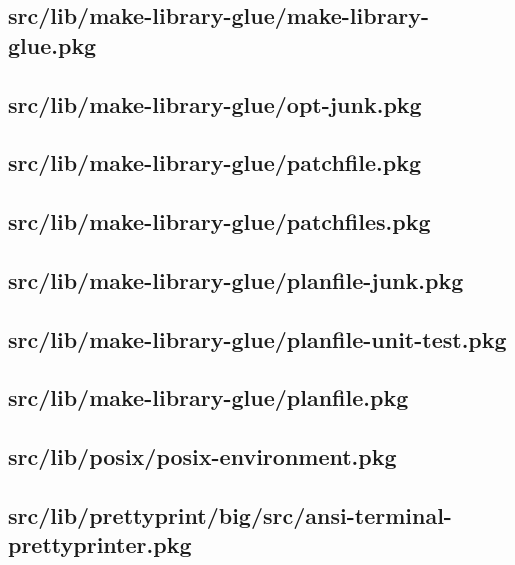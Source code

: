 \subsection{src/lib/make-library-glue/make-library-glue.pkg}


\subsection{src/lib/make-library-glue/opt-junk.pkg}


\subsection{src/lib/make-library-glue/patchfile.pkg}


\subsection{src/lib/make-library-glue/patchfiles.pkg}


\subsection{src/lib/make-library-glue/planfile-junk.pkg}


\subsection{src/lib/make-library-glue/planfile-unit-test.pkg}


\subsection{src/lib/make-library-glue/planfile.pkg}


\subsection{src/lib/posix/posix-environment.pkg}


\subsection{src/lib/prettyprint/big/src/ansi-terminal-prettyprinter.pkg}


